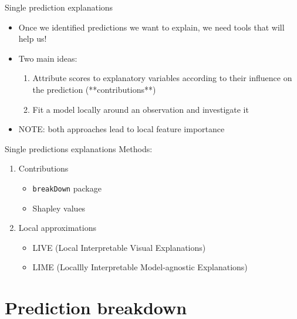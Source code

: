 \documentclass[xcolor={dvipsnames}]{beamer}
\begin{document}
\begin{frame}{Single prediction explanations}
	\begin{itemize}
		\item Once we identified predictions we want to explain, we need tools that will help us!
		\item Two main ideas:
		\begin{enumerate}
			\item Attribute scores to explanatory variables according to their influence on the prediction (**contributions**)
			
			\item Fit a model locally around an observation and investigate it
		\end{enumerate}
	    \item NOTE: both approaches lead to local feature importance
	\end{itemize}
\end{frame}

\begin{frame}{Single predictions explanations}
	Methods:
	\begin{enumerate}
		\item Contributions
		\begin{itemize}
			\item \texttt{breakDown} package
			\item Shapley values
		\end{itemize}
	    \item Local approximations
	    \begin{itemize}
	    	\item LIVE (Local Interpretable Visual Explanations)
	    	\item LIME (Locallly Interpretable Model-agnostic Explanations)
	    \end{itemize}
	\end{enumerate}
\end{frame}

\section{Prediction breakdown}
\end{document}
